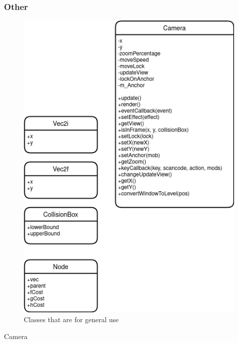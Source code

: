 \documentclass{article}
\begin{document}
            \subsubsection{Other}
                \begin{figure}[hbt!]
                    \centerline{\includegraphics[scale=0.5]{img/Classes/Other.png}}
                    \caption{Classes that are for general use}
                    \label{fig}
                \end{figure}
                Camera
\end{document}
